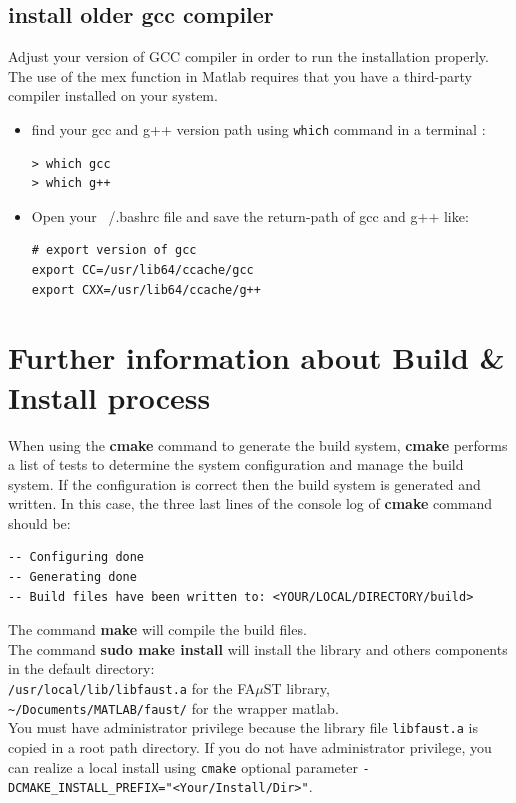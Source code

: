 \subsection{install older gcc compiler}
Adjust your version of GCC compiler in order to run the installation properly. The use of the mex function in Matlab requires that you have a third-party compiler installed on your system. 
\begin{itemize}

\item  find your gcc and g++ version path using \texttt{which} command in a terminal :
\lstset{style=customBash}
\begin{lstlisting}
> which gcc
> which g++
\end{lstlisting}

\item Open your ~/.bashrc file and save the return-path of gcc and g++ like:
\lstset{style=customBash}
\begin{lstlisting}
# export version of gcc
export CC=/usr/lib64/ccache/gcc
export CXX=/usr/lib64/ccache/g++
\end{lstlisting}
\end{itemize}



\section{Further information about Build \& Install process}\label{sec:ANNEXEInfoBuildInstall}
When using the \textbf{cmake} command to generate the build system, \textbf{cmake} performs a list of tests to determine the system configuration and manage the build system. If the configuration is correct then the build system is generated and written. In this case, the three last lines of the console log of \textbf{cmake} command should be:
\lstset{style=customBash}
\begin{lstlisting}
-- Configuring done 
-- Generating done 
-- Build files have been written to: <YOUR/LOCAL/DIRECTORY/build>
\end{lstlisting}

The command \textbf{make} will compile the build files.\\

The command \textbf{sudo make install} will install the library and others components in the default directory: \\
\texttt{/usr/local/lib/libfaust.a} for the FA$\mu$ST library, \\
\texttt{\textasciitilde /Documents/MATLAB/faust/} for the wrapper matlab.\\
You must have administrator privilege because the library file \texttt{libfaust.a} is copied in a root path directory. If you do not have administrator privilege, you can realize a local install using \texttt{cmake} optional parameter \texttt{-DCMAKE\_INSTALL\_PREFIX="<Your/Install/Dir>"}. 

